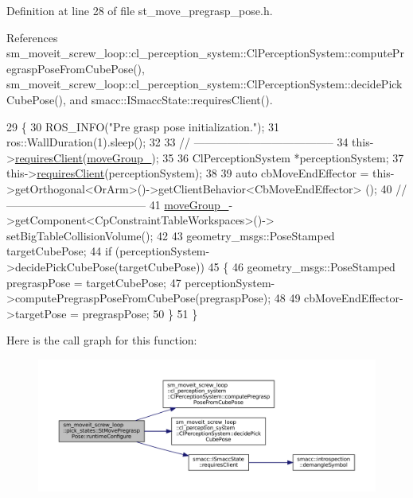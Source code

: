Definition at line 28 of file st\+\_\+move\+\_\+pregrasp\+\_\+pose.\+h.



References sm\+\_\+moveit\+\_\+screw\+\_\+loop\+::cl\+\_\+perception\+\_\+system\+::\+Cl\+Perception\+System\+::compute\+Pregrasp\+Pose\+From\+Cube\+Pose(), sm\+\_\+moveit\+\_\+screw\+\_\+loop\+::cl\+\_\+perception\+\_\+system\+::\+Cl\+Perception\+System\+::decide\+Pick\+Cube\+Pose(), and smacc\+::\+I\+Smacc\+State\+::requires\+Client().


\begin{DoxyCode}
29             \{
30                 ROS\_INFO(\textcolor{stringliteral}{"Pre grasp pose initialization."});
31                 ros::WallDuration(1).sleep();
32 
33                 \textcolor{comment}{// --------------------------------------}
34                 this->\hyperlink{classsmacc_1_1ISmaccState_a7f95c9f0a6ea2d6f18d1aec0519de4ac}{requiresClient}(\hyperlink{structsm__moveit__screw__loop_1_1pick__states_1_1StMovePregraspPose_af7a13ebe05f10fe4f2488aab0aabf13e}{moveGroup\_});
35                 
36                 ClPerceptionSystem *perceptionSystem;
37                 this->\hyperlink{classsmacc_1_1ISmaccState_a7f95c9f0a6ea2d6f18d1aec0519de4ac}{requiresClient}(perceptionSystem);
38 
39                 \textcolor{keyword}{auto} cbMoveEndEffector = this->getOrthogonal<OrArm>()->getClientBehavior<CbMoveEndEffector>
      ();
40                 \textcolor{comment}{// --------------------------------------}
41                 \hyperlink{structsm__moveit__screw__loop_1_1pick__states_1_1StMovePregraspPose_af7a13ebe05f10fe4f2488aab0aabf13e}{moveGroup\_}->getComponent<CpConstraintTableWorkspaces>()->
      setBigTableCollisionVolume();
42 
43                 geometry\_msgs::PoseStamped targetCubePose;
44                 \textcolor{keywordflow}{if} (perceptionSystem->decidePickCubePose(targetCubePose))
45                 \{
46                     geometry\_msgs::PoseStamped pregraspPose = targetCubePose;
47                     perceptionSystem->computePregraspPoseFromCubePose(pregraspPose);
48 
49                     cbMoveEndEffector->targetPose = pregraspPose;
50                 \}
51             \}
\end{DoxyCode}
Here is the call graph for this function\+:
\nopagebreak
\begin{figure}[H]
\begin{center}
\leavevmode
\includegraphics[width=350pt]{structsm__moveit__screw__loop_1_1pick__states_1_1StMovePregraspPose_a364b45012382fbf007accac5cc583b26_cgraph}
\end{center}
\end{figure}
